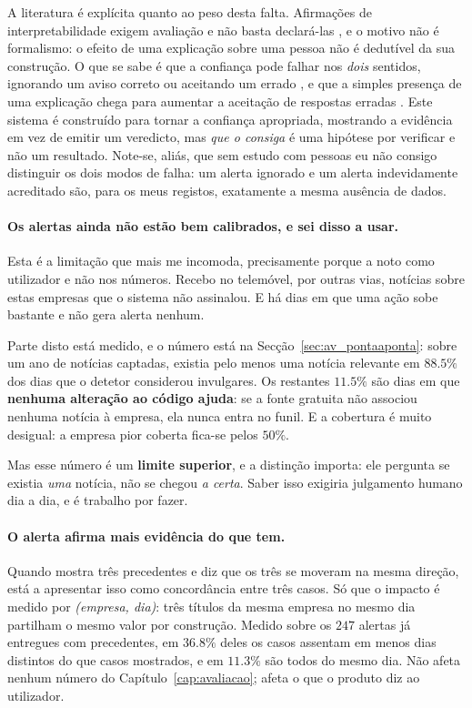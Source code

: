 A literatura é explícita quanto ao peso desta falta. Afirmações de interpretabilidade exigem
avaliação e não basta declará-las \autocite{doshivelez2017rigorous}, e o motivo não é
formalismo: o efeito de uma explicação sobre uma pessoa não é dedutível da sua construção. O que se
sabe é que a confiança pode falhar nos \emph{dois} sentidos, ignorando um aviso correto ou aceitando
um errado \autocite{lee2004trust}, e que a simples presença de uma explicação chega para aumentar a
aceitação de respostas erradas \autocite{bansal2021whole}. Este sistema é construído para tornar a
confiança apropriada, mostrando a evidência em vez de emitir um veredicto, mas \emph{que o consiga} é
uma hipótese por verificar e não um resultado. Note-se, aliás, que sem estudo com pessoas eu não
consigo distinguir os dois modos de falha: um alerta ignorado e um alerta indevidamente acreditado
são, para os meus registos, exatamente a mesma ausência de dados.

\paragraph{Os alertas ainda não estão bem calibrados, e sei disso a usar.}
Esta é a limitação que mais me incomoda, precisamente porque a noto como utilizador e não nos
números. Recebo no telemóvel, por outras vias, notícias sobre estas empresas que o sistema não
assinalou. E há dias em que uma ação sobe bastante e não gera alerta nenhum.

Parte disto está medido, e o número está na Secção~\ref{sec:av_pontaaponta}: sobre um ano de
notícias captadas, existia pelo menos uma notícia relevante em $88.5\%$ dos dias que o detetor
considerou invulgares. Os restantes $11.5\%$ são dias em que
\textbf{nenhuma alteração ao código ajuda}: se a fonte gratuita não associou nenhuma notícia à
empresa, ela nunca entra no funil. E a cobertura é muito desigual: a empresa pior coberta fica-se
pelos $50\%$.

Mas esse número é um \textbf{limite superior}, e a distinção importa: ele pergunta se existia
\emph{uma} notícia, não se chegou \emph{a certa}. Saber isso exigiria julgamento humano dia a dia, e
é trabalho por fazer.

\paragraph{O alerta afirma mais evidência do que tem.}
Quando mostra três precedentes e diz que os três se moveram na mesma direção, está a apresentar isso
como concordância entre três casos. Só que o impacto é medido por \emph{(empresa, dia)}: três
títulos da mesma empresa no mesmo dia partilham o mesmo valor por construção. Medido sobre os
$247$ alertas já entregues com precedentes, em $36.8\%$ deles os casos assentam em menos dias
distintos do que casos mostrados, e em $11.3\%$ são todos do mesmo dia. Não afeta nenhum número do
Capítulo~\ref{cap:avaliacao}; afeta o que o produto diz ao utilizador.

